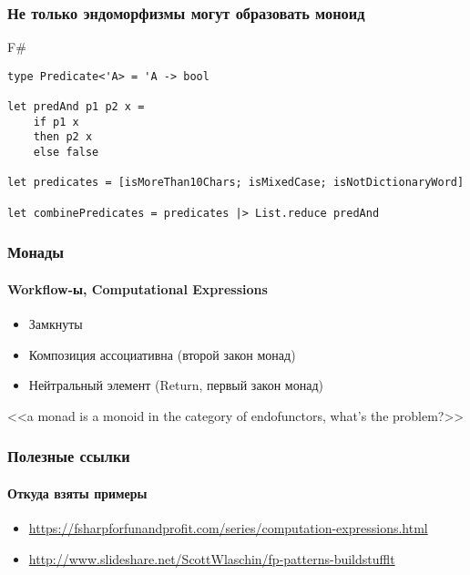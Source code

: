 \documentclass[xetex,mathserif,serif]{beamer}
\begin{document}
	\begin{frame}[fragile]
		\frametitle{Не только эндоморфизмы могут образовать моноид}
   		\begin{exampleblock}{F\#}
   			\begin{lstlisting}
type Predicate<'A> = 'A -> bool

let predAnd p1 p2 x = 
    if p1 x 
    then p2 x
    else false
    
let predicates = [isMoreThan10Chars; isMixedCase; isNotDictionaryWord]

let combinePredicates = predicates |> List.reduce predAnd
\end{lstlisting}
\end{exampleblock}
\end{frame}

	\begin{frame}
		\frametitle{Монады}
		\framesubtitle{Workflow-ы, Computational Expressions}
		\begin{itemize}
    		\item Замкнуты
    		\item Композиция ассоциативна (второй закон монад)
    		\item Нейтральный элемент (Return, первый закон монад)
		\end{itemize}
		<<a monad is a monoid in the category of endofunctors, what's the problem?>>
    \end{frame}

	\begin{frame}
		\frametitle{Полезные ссылки}
		\framesubtitle{Откуда взяты примеры}
		\begin{small}
    		\begin{itemize}
        		\item \url{https://fsharpforfunandprofit.com/series/computation-expressions.html}
        		\item \url{http://www.slideshare.net/ScottWlaschin/fp-patterns-buildstufflt}
    		\end{itemize}
		\end{small}
    \end{frame}
\end{document}
